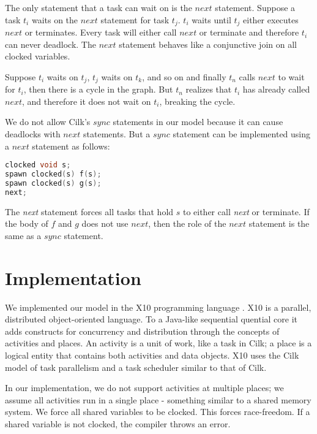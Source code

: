 \documentclass[10pt, conference, compsocconf]{IEEEtran}
\begin{document}
The only statement that a task can wait on is the $next$ statement.
Suppose a task $t_i$ waits on the $next$ statement for task $t_j$.
$t_i$ waits until $t_j$ either executes $next$ or terminates.
Every task will either call $next$ or terminate and therefore
$t_i$ can never deadlock.
The $next$ statement  behaves like a conjunctive join on 
all clocked variables.

Suppose $t_i$ waits on $t_j$, $t_j$ waits on $t_k$, and so on
and finally $t_n$ calls $next$ to wait for $t_i$, then there is a cycle in the 
graph. But $t_n$ realizes that $t_i$ has already called $next$, and therefore
it does not wait on $t_i$, breaking the cycle.  

We do not allow Cilk's $sync$ statements in our model because it can cause
deadlocks with $next$ statements.
But a $sync$ statement can be implemented using a $next$ statement as follows:
\begin{lstlisting}[language=c]
clocked void s;
spawn clocked(s) f(s);
spawn clocked(s) g(s);
next;
\end{lstlisting}

The \emph{next} statement forces all tasks that hold $s$ to either
call \emph{next} or terminate. If the body of $f$ and $g$ does not
use $next$, then the role of the $next$ statement is the same as a $sync$
statement.


\section{Implementation}
\label{sec:implementation}

We implemented our model in the X10 programming language \cite{charles2005x10}.
X10 is a parallel, distributed object-oriented language. To a Java-like sequential 
quential core it adds constructs for concurrency and distribution through the 
concepts of activities and places. An activity is a unit of work, like a task in 
Cilk; a place is a logical entity that contains both activities and data objects.
X10 uses the Cilk model of task parallelism and a task scheduler similar to that
of Cilk.

In our implementation, we do not support activities at multiple places; we assume all activities run
in a single place - something similar to a shared memory system. 
We force all shared variables to be clocked. This forces
race-freedom. If a shared variable is not clocked, the compiler throws
an error.
\end{document}
